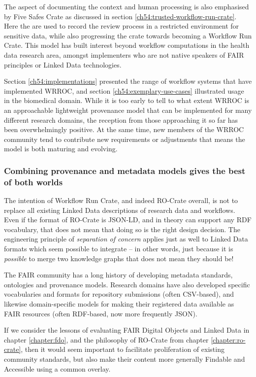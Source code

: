 The aspect of documenting the context and human processing is also emphasised by Five Safes Crate \cite{Soiland-Reyes 2023f} as discussed in section \vref{ch54:trusted-workflow-run-crate}. Here the \cite{schema actions} are used to record the review process in a restricted environment for sensitive data, while also progressing the crate towards becoming a Workflow Run Crate. This model has built interest beyond workflow computations in the health data research area, amongst implementers who are not native speakers of FAIR principles or Linked Data technologies.

Section \vref{ch54:implementations} presented the range of workflow systems that have implemented WRROC, and section \vref{ch54:exemplary-use-cases} illustrated usage in the biomedical domain. While it is too early to tell to what extent WRROC is an approachable lightweight provenance model that can be implemented for many different research domains, the reception from those approaching it so far has been overwhelmingly positive. At the same time, new members of the WRROC community tend to contribute new requirements or adjustments that means the model is both maturing and evolving.


\subsubsection{Combining provenance and metadata models gives the best of both worlds}

The intention of Workflow Run Crate, and indeed RO-Crate overall, is not to replace all existing Linked Data descriptions of research data and workflows. Even if the format of RO-Crate is JSON-LD, and in theory can support any RDF vocabulary, that does not mean that doing so is the right design decision. The engineering principle of \emph{separation of concern} applies just as well to Linked Data formats which seem possible to integrate -- in other words, just because it is \emph{possible} to merge two knowledge graphs that does not mean they should be!

The FAIR community has a long history of developing metadata standards, ontologies and provenance models. Research domains have also developed specific vocabularies and formats for repository submissions (often CSV-based), and likewise domain-specific models for making their registered data available as FAIR resources (often RDF-based, now more frequently JSON). 

If we consider the lessons of evaluating FAIR Digital Objects and Linked Data in chapter \vref{chapter:fdo}, and the philosophy of RO-Crate from chapter \vref{chapter:ro-crate}, then it would seem important to facilitate proliferation of existing community standards, but also make their content more generally Findable and Accessible using a common overlay.

